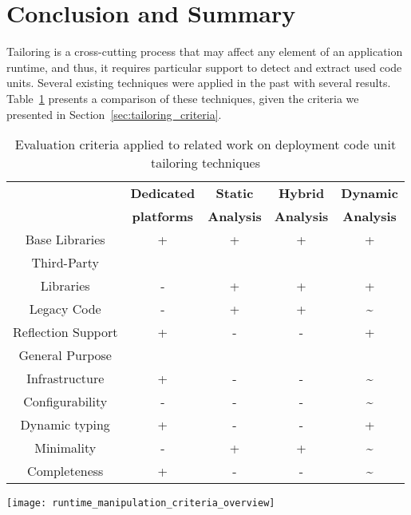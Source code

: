 \section{Conclusion and Summary}

Tailoring is a cross-cutting process that may affect any element of an application runtime, and thus, it requires particular support to detect and extract used code units. Several existing techniques were applied in the past with several results.
Table~\ref{tb:comparison_intro} presents a comparison of these techniques, given the criteria we presented in Section~\ref{sec:tailoring_criteria}.

\begin{table}[ht]
 	\centering
 	\begin{tabular}{ccccc}
	
\toprule
 			& \textbf{Dedicated}
 			& \textbf{Static}
			& \textbf{Hybrid}
 			& \textbf{Dynamic} \\
 			& \textbf{platforms}
 			& \textbf{Analysis}
			& \textbf{Analysis}
 			& \textbf{Analysis}\\
 \toprule

		Base Libraries
 			& + & + & + & +\\
		\midrule
		Third-Party
		& & & & \\Libraries
 			& - & + & + & +\\
		\midrule
		Legacy Code
 			& - & + & + & \textasciitilde \\
		\midrule
		Reflection Support
 			& + & - & - & + \\
		\midrule
		General Purpose
			& & & & \\
		Infrastructure
 			& + & - & - & \textasciitilde  \\
		\midrule
		Configurability
 			& - & - & - & \textasciitilde   \\
		\midrule
		Dynamic typing
 			& + & - & - & + \\
		\midrule
		Minimality
 			& - & + & + & \textasciitilde \\
		\midrule
		Completeness
 			& + & - & - & \textasciitilde \\
\bottomrule
 	\end{tabular}
	
	\texttt{[image: runtime\_manipulation\_criteria\_overview]}
 	\caption{Evaluation criteria applied to related work on deployment code unit tailoring techniques}
 	\label{tb:comparison_intro}
 \end{table}

